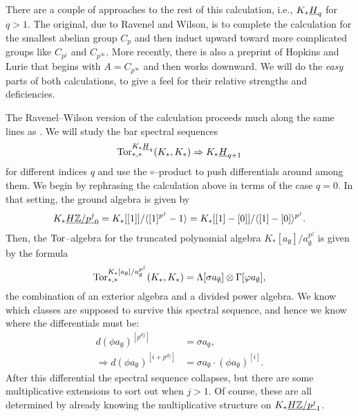 There are a couple of approaches to the rest of this calculation, i.e., $K_* \underline{\smash{H}}_{q}$ for $q > 1$.  The original, due to Ravenel and Wilson, is to complete the calculation for the smallest abelian group $C_p$ and then induct upward toward more complicated groups like $C_{p^j}$ and $C_{p^\infty}$.  More recently, there is also a preprint of Hopkins and Lurie that begins with $A = C_{p^\infty}$ and then works downward.  We will do the \emph{easy} parts of both calculations, to give a feel for their relative strengths and deficiencies.

The Ravenel--Wilson version of the calculation proceeds much along the same lines as .  We will study the bar spectral sequences \[\operatorname{Tor}^{K_* \underline{\smash{H}}_{q}}_{*, *}(K_*, K_*) \Rightarrow K_* \underline{\smash{H}}_{q+1}\] for different indices $q$ and use the $\circ$--product to push differentials around among them.  We begin by rephrasing the calculation above in terms of the case $q = 0$.  In that setting, the ground algebra is given by \[K_* \underline{\smash{H\mathbb Z/p^j}}_{0} = K_*[[1]] / \langle[1]^{p^j} - 1\rangle = K_*[[1] - [0]] / \langle[1] - [0]\rangle^{p^j}.\]  Then, the $\operatorname{Tor}$--algebra for the truncated polynomial algebra $K_*[a_\emptyset] / a_\emptyset^{p^j}$ is given by the formula \[\operatorname{Tor}^{K_*[a_\emptyset] / a_\emptyset^{p^j}}_{*, *}(K_*, K_*) = \Lambda[\sigma a_\emptyset] \otimes \Gamma[\varphi a_\emptyset],\] the combination of an exterior algebra and a divided power algebra.  We know which classes are supposed to survive this spectral sequence, and hence we know where the differentials must be:
\begin{align*}
d(\phi a_\emptyset)^{[p^{dj}]} & = \sigma a_\emptyset, \\
\Rightarrow d(\phi a_\emptyset)^{[i + p^{dj}]} & = \sigma a_\emptyset \cdot (\phi a_\emptyset)^{[i]}.
\end{align*}
After this differential the spectral sequence collapses, but there are some multiplicative extensions to sort out when $j > 1$.  Of course, these are all determined by already knowing the multiplicative structure on $K_* \underline{\smash{H\mathbb Z/p^j}}_{1}$.

